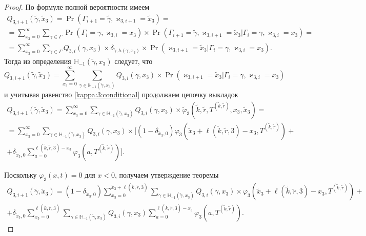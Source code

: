 \documentclass{report}
\begin{document}
\begin{proof}
По формуле полной вероятности имеем
\begin{multline*}
Q_{3,i+1}(\tilde{\gamma},\tilde{x}_3) = \Pr(\Gamma_{i+1}=\tilde{\gamma}, \varkappa_{3,i+1}=\tilde{x}_3) = \\
= \sum_{x_3=0}^{\infty}\sum_{\gamma \in \Gamma} \Pr(\Gamma_{i}=\gamma, \varkappa_{3,i}=x_3) \times \Pr(\Gamma_{i+1}=\tilde{\gamma}, \varkappa_{3,i+1}=\tilde{x}_3 | \Gamma_{i}=\gamma, \varkappa_{3,i}=x_3) =  \\ 
= \sum_{x_3=0}^{\infty}\sum_{\gamma \in \Gamma} Q_{3,i}(\gamma,x_3) \times \delta_{\tilde{\gamma},h(\gamma,x_3)}\times
\Pr(\varkappa_{3,i+1}=\tilde{x}_3 | \Gamma_{i}=\gamma, \varkappa_{3,i}=x_3).
\end{multline*}
Тогда из определения $ {\mathbb H}_{-1}(\tilde{\gamma},x_3)$ следует, что 
\begin{equation*}
Q_{3,i+1}(\tilde{\gamma},\tilde{x}_3) =\sum_{x_3=0}^{\infty}\sum_{\gamma \in {\mathbb H}_{-1}(\tilde{\gamma},x_3)} Q_{3,i}(\gamma,x_3) \times 
\Pr(\varkappa_{3,i+1}=\tilde{x}_3 | \Gamma_{i}=\gamma, \varkappa_{3,i}=x_3)
\end{equation*}
и учитывая равенство \eqref{kappa:3:conditional} продолжаем цепочку выкладок
\begin{multline*}
Q_{3,i+1}(\tilde{\gamma},\tilde{x}_3)= \sum_{x_3=0}^{\infty}\sum_{\gamma \in {\mathbb H}_{-1}(\tilde{\gamma},x_3)} Q_{3,i}(\gamma,x_3) \times 
\tilde{\varphi}_3(\tilde{k},\tilde{r}, T^{(\tilde{k},\tilde{r})},x_3,\tilde{x}_3) = \\
= \sum_{x_3=0}^{\infty}\sum_{\gamma \in {\mathbb H}_{-1}(\tilde{\gamma},x_3)} Q_{3,i}(\gamma,x_3) \times 
[ (1-\delta_{\tilde{x}_3,0})\varphi_3(\tilde{x}_3 + \ell(\tilde{k},\tilde{r},3) - x_3,T^{(\tilde{k},\tilde{r})}) + \\ 
+\delta_{\tilde{x}_3,0} \sum_{a=0}^{\ell(\tilde{k},\tilde{r},3)-x_3}\varphi_3(a,T^{(\tilde{k},\tilde{r})})].
\end{multline*}

Поскольку  $\varphi_3(x,t)=0$ для $x<0$, получаем утверждение теоремы
\begin{multline*}
Q_{3,i+1}(\tilde{\gamma},\tilde{x}_3)= (1-\delta_{\tilde{x}_3,0}) \sum_{x_3=0}^{\tilde{x}_3 +  \ell(\tilde{k},\tilde{r},3)}\sum_{\gamma \in {\mathbb H}_{-1}(\tilde{\gamma},x_3)} Q_{3,i}(\gamma,x_3) \times 
\varphi_3(\tilde{x}_3 + \ell(\tilde{k},\tilde{r},3) - x_3,T^{(\tilde{k},\tilde{r})}) + \\
+ \delta_{\tilde{x}_3,0} \sum_{x_3=0}^{\ell(\tilde{k},\tilde{r},3)}\sum_{\gamma \in {\mathbb H}_{-1}(\tilde{\gamma},x_3)} Q_{3,i}(\gamma,x_3) \sum_{a=0}^{\ell(\tilde{k},\tilde{r},3) - x_3} \varphi_3(a,T^{(\tilde{k},\tilde{r})}).
\end{multline*}
\end{proof}
\end{document}
